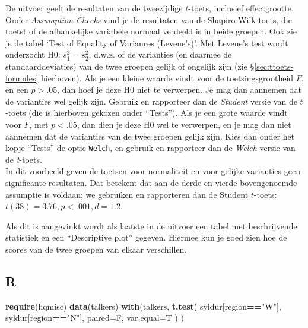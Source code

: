 \documentclass[
]{book}
\newenvironment{Shaded}{\begin{snugshade}}{\end{snugshade}}
\newcommand{\DataTypeTok}[1]{\textcolor[rgb]{0.13,0.29,0.53}{#1}}
\newcommand{\KeywordTok}[1]{\textcolor[rgb]{0.13,0.29,0.53}{\textbf{#1}}}
\newcommand{\NormalTok}[1]{#1}
\newcommand{\OperatorTok}[1]{\textcolor[rgb]{0.81,0.36,0.00}{\textbf{#1}}}
\newcommand{\StringTok}[1]{\textcolor[rgb]{0.31,0.60,0.02}{#1}}
\begin{document}
De uitvoer geeft de resultaten van de tweezijdige \(t\)-toets, inclusief effectgrootte.\\

Onder \emph{Assumption Checks} vind je de resultaten van de Shapiro-Wilk-toets, die toetst of de afhankelijke variabele normaal verdeeld is in beide groepen. Ook zie je de tabel `Test of Equality of Variances (Levene's)'. Met Levene's test wordt onderzocht H0: \(s^2_1 = s^2_2\), d.w.z. of de varianties (en daarmee de standaarddeviaties) van de twee groepen gelijk of ongelijk zijn (zie §\ref{sec:ttoets-formules} hierboven).
Als je een kleine waarde vindt voor de toetsingsgrootheid \(F\), en een \(p>.05\), dan hoef je deze H0 niet te verwerpen. Je mag dan aannemen dat de varianties wel gelijk zijn. Gebruik en rapporteer dan de \emph{Student} versie van de \(t\)-toets (die is hierboven gekozen onder ``Tests'').
Als je een grote waarde vindt voor \(F\), met \(p<.05\), dan dien je deze H0 wel te verwerpen, en je mag dan niet aannemen dat de varianties van de twee groepen gelijk zijn. Kies dan onder het kopje ``Tests'' de optie \texttt{Welch}, en gebruik en rapporteer dan de \emph{Welch} versie van de \emph{t}-toets.\\

In dit voorbeeld geven de toetsen voor normaliteit en voor gelijke varianties geen significante resultaten. Dat betekent dat aan de derde en vierde bovengenoemde assumptie is voldaan; we gebruiken en rapporteren dan de Student \(t\)-toets: \(t(38)=3.76, p<.001, d=1.2\).

Als dit is aangevinkt wordt als laatste in de uitvoer een tabel met beschrijvende statistiek en een ``Descriptive plot'' gegeven. Hiermee kun je goed zien hoe de scores van de twee groepen van elkaar verschillen.

\hypertarget{sec:R-ttoets-ongepaard}{%
\subsection{R}\label{sec:R-ttoets-ongepaard}}

\begin{Shaded}
\begin{Highlighting}[]
\KeywordTok{require}\NormalTok{(hqmisc)}
\KeywordTok{data}\NormalTok{(talkers)}
\KeywordTok{with}\NormalTok{(talkers, }\KeywordTok{t.test}\NormalTok{( syldur[region}\OperatorTok{==}\StringTok{"W"}\NormalTok{], syldur[region}\OperatorTok{==}\StringTok{"N"}\NormalTok{], }
            \DataTypeTok{paired=}\NormalTok{F, }\DataTypeTok{var.equal=}\NormalTok{T ) )}
\end{Highlighting}
\end{Shaded}
\end{document}
